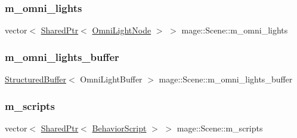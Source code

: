 \subsubsection{\texorpdfstring{m\+\_\+omni\+\_\+lights}{m\_omni\_lights}}
{\footnotesize\ttfamily vector$<$ \hyperlink{namespacemage_a1e01ae66713838a7a67d30e44c67703e}{Shared\+Ptr}$<$ \hyperlink{namespacemage_a1724c6e6b6b5ba535cdd967cbbb4a669}{Omni\+Light\+Node} $>$ $>$ mage\+::\+Scene\+::m\+\_\+omni\+\_\+lights\hspace{0.3cm}{\ttfamily [private]}}

\hypertarget{classmage_1_1_scene_a274ed5e548431ba805513a86a00bbaf1}{}\label{classmage_1_1_scene_a274ed5e548431ba805513a86a00bbaf1} 
\subsubsection{\texorpdfstring{m\+\_\+omni\+\_\+lights\+\_\+buffer}{m\_omni\_lights\_buffer}}
{\footnotesize\ttfamily \hyperlink{structmage_1_1_structured_buffer}{Structured\+Buffer}$<$ Omni\+Light\+Buffer $>$ mage\+::\+Scene\+::m\+\_\+omni\+\_\+lights\+\_\+buffer\hspace{0.3cm}{\ttfamily [private]}}

\hypertarget{classmage_1_1_scene_a84548bf6978f8955ce5892cb23536a4e}{}\label{classmage_1_1_scene_a84548bf6978f8955ce5892cb23536a4e} 
\subsubsection{\texorpdfstring{m\+\_\+scripts}{m\_scripts}}
{\footnotesize\ttfamily vector$<$ \hyperlink{namespacemage_a1e01ae66713838a7a67d30e44c67703e}{Shared\+Ptr}$<$ \hyperlink{classmage_1_1_behavior_script}{Behavior\+Script} $>$ $>$ mage\+::\+Scene\+::m\+\_\+scripts\hspace{0.3cm}{\ttfamily [private]}}

\hypertarget{classmage_1_1_scene_a4e1954bc0b812d6a71123ca3ac9eeb75}{}\label{classmage_1_1_scene_a4e1954bc0b812d6a71123ca3ac9eeb75} 
